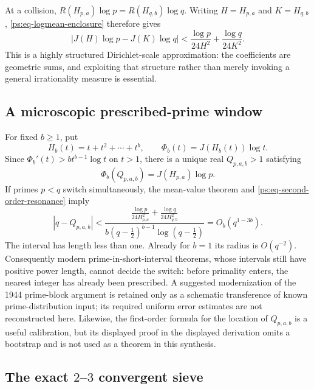 \documentclass[11pt,oneside]{article}
\theoremstyle{definition}
\theoremstyle{remark}
\begin{document}
At a collision, $R(H_{p,a})\log p=R(H_{q,b})\log q$.  Writing
$H=H_{p,a}$ and $K=H_{q,b}$, \eqref{ps:eq-logmean-enclosure} therefore gives
\begin{equation}
 \left|J(H)\log p-J(K)\log q\right|
 <\frac{\log p}{24H^2}+\frac{\log q}{24K^2}.
 \label{ps:eq-second-order-resonance}
\end{equation}
This is a highly structured Dirichlet-scale approximation: the coefficients are geometric
sums, and exploiting that structure rather than merely invoking a general irrationality
measure is essential.

\subsection{A microscopic prescribed-prime window}
\label{ps:microscopic-window}

For fixed $b\ge1$, put
\[
 H_b(t)=t+t^2+\cdots+t^b,
 \qquad \Phi_b(t)=J(H_b(t))\log t.
\]
Since $\Phi_b'(t)>bt^{b-1}\log t$ on $t>1$, there is a unique real
$Q_{p,a,b}>1$ satisfying
\[
 \Phi_b(Q_{p,a,b})=J(H_{p,a})\log p.
\]
If primes $p<q$ switch simultaneously, the mean-value theorem and
\eqref{ps:eq-second-order-resonance} imply
\begin{equation}
 |q-Q_{p,a,b}|<
 \frac{\frac{\log p}{24H_{p,a}^{2}}+
       \frac{\log q}{24H_{q,b}^{2}}}
      {b(q-\frac12)^{b-1}\log(q-\frac12)}
 =O_b(q^{1-3b}).
 \label{ps:eq-microscopic-window}
\end{equation}
The interval has length less than one.  Already for $b=1$ its radius is $O(q^{-2})$.
Consequently modern prime-in-short-interval theorems, whose intervals still have positive
power length, cannot decide the switch: before primality enters, the nearest integer has
already been prescribed.  A suggested modernization of the 1944 prime-block
argument is retained only as a schematic transference of known prime-distribution input; its
required uniform error estimates are not reconstructed here.  Likewise, the first-order
formula for the location of $Q_{p,a,b}$ is a useful calibration, but its displayed proof in
the displayed derivation omits a bootstrap and is not used as a theorem in this synthesis.

\subsection{The exact \texorpdfstring{$2$--$3$}{2--3} convergent sieve}
\label{ps:two-three-sieve}
\end{document}
